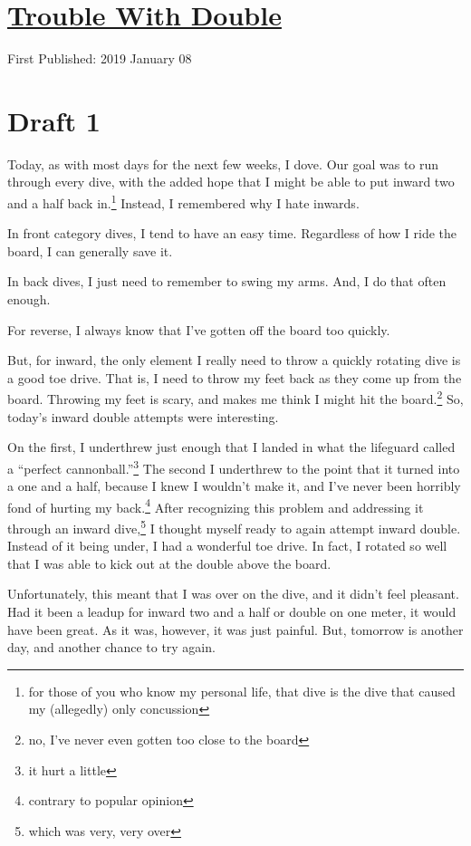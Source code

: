 \documentclass[12pt]{article}[titlepage]
\newcommand{\say}[1]{``#1''}
\newcommand{\1}{\={a}}
\newcommand{\2}{\={e}}
\newcommand{\3}{\={\i}}
\newcommand{\4}{\=o}
\newcommand{\5}{\=u}
\newcommand{\6}{\={A}}
\renewcommand{\,}{\textsuperscript{,}}
\begin{document}
\doublespacing
\section{\href{trouble-with-double.html}{Trouble With Double}}
First Published: 2019 January 08
\section{Draft 1}
Today, as with most days for the next few weeks, I dove.
Our goal was to run through every dive, with the added hope that I might be able to put inward two and a half back in.\footnote{for those of you who know my personal life, that dive is the dive that caused my (allegedly) only concussion}
Instead, I remembered why I hate inwards.

In front category dives, I tend to have an easy time.
Regardless of how I ride the board, I can generally save it.

In back dives, I just need to remember to swing my arms.
And, I do that often enough.

For reverse, I always know that I've gotten off the board too quickly.

But, for inward, the only element I really need to throw a quickly rotating dive is a good toe drive.
That is, I need to throw my feet back as they come up from the board.
Throwing my feet is scary, and makes me think I might hit the board.\footnote{no, I've never even gotten too close to the board}
So, today's inward double attempts were interesting.

On the first, I underthrew just enough that I landed in what the lifeguard called a \say{perfect cannonball.}\footnote{it hurt a little}
The second I underthrew to the point that it turned into a one and a half, because I knew I wouldn't make it, and I've never been horribly fond of hurting my back.\footnote{contrary to popular opinion}
After recognizing this problem and addressing it through an inward dive,\footnote{which was very, very over} I thought myself ready to again attempt inward double.
Instead of it being under, I had a wonderful toe drive.
In fact, I rotated so well that I was able to kick out at the double above the board.

Unfortunately, this meant that I was over on the dive, and it didn't feel pleasant.
Had it been a leadup for inward two and a half or double on one meter, it would have been great.
As it was, however, it was just painful.
But, tomorrow is another day, and another chance to try again.
\end{document}

